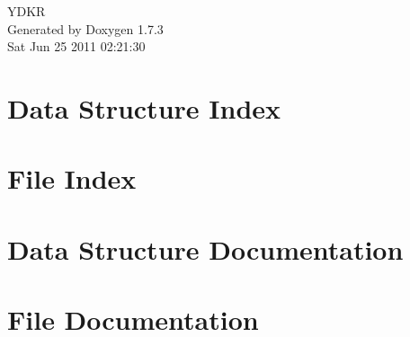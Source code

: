 \documentclass[a4paper]{book}
\begin{document}
\hypersetup{pageanchor=false}
\begin{titlepage}
\vspace*{7cm}
\begin{center}
{\Large YDKR }\\
\vspace*{1cm}
{\large Generated by Doxygen 1.7.3}\\
\vspace*{0.5cm}
{\small Sat Jun 25 2011 02:21:30}\\
\end{center}
\end{titlepage}
\clearemptydoublepage
{}
\tableofcontents
\clearemptydoublepage
{}
\hypersetup{pageanchor=true}
\chapter{Data Structure Index}

\chapter{File Index}

\chapter{Data Structure Documentation}




















\chapter{File Documentation}















\printindex
\end{document}
